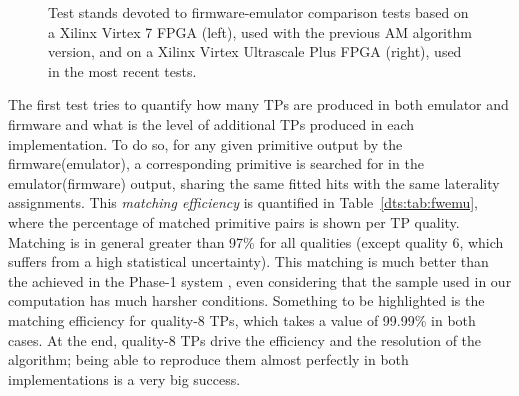 \documentclass[../main.tex]{subfiles}
\begin{document}
\begin{figure}[h!]
\begin{center}
 \qquad
{}
\end{center}
\caption[Firmware-emulator comparison test stands]{Test stands devoted to firmware-emulator comparison tests based on a Xilinx Virtex 7 FPGA (left), used with the previous AM algorithm version, and on a Xilinx Virtex Ultrascale Plus FPGA (right), used in the most recent tests.}
\label{dts:fig:teststands}
\end{figure}



The first test tries to quantify how many TPs are produced in both emulator and firmware and what is the level of additional TPs produced in each implementation. To do so, for any given primitive output by the firmware(emulator), a corresponding primitive is searched for in the emulator(firmware) output, sharing the same fitted hits with the same laterality assignments. This \textit{matching efficiency} is quantified in Table~\ref{dts:tab:fwemu}, where the percentage of matched primitive pairs is shown per TP quality. Matching is in general greater than 97\% for all qualities (except quality 6, which suffers from a high statistical uncertainty). This matching is much better than the achieved in the Phase-1 system \cite{intro:exp:dt_performance}, even considering that the sample used in our computation has much harsher conditions. Something to be highlighted is the matching efficiency for quality-8 TPs, which takes a value of 99.99\% in both cases. At the end, quality-8 TPs drive the efficiency and the resolution of the algorithm; being able to reproduce them almost perfectly in both implementations is a very big success.
\end{document}

